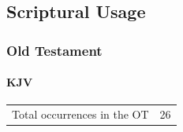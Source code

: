 \subsection{Scriptural Usage} %
	\label{FIRSTFRUITS-SCRIPTURES}

	\subsubsection{Old Testament} %
		\label{FIRSTFRUITS-OT}
	
		\paragraph{KJV}
			\label{FIRSTFRUITS-OT-KJV}
	
			\begin{tabular}{ll}
				Total occurrences in the OT & 26
			\end{tabular}
			
